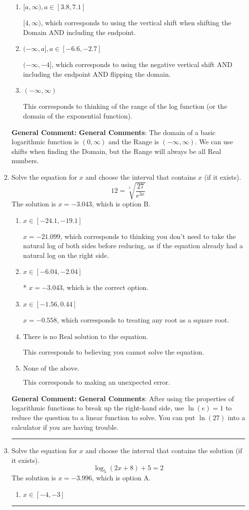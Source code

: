 \documentclass{extbook}[14pt]
\newcommand{\litem}[1]{\item #1

\rule{\textwidth}{0.4pt}}
\begin{document}
\begin{enumerate}
{\begin{enumerate}[label=\Alph*.]
* $(-8, \infty)$, which is the correct option.
\item \( [a, \infty), a \in [3.8, 7.1] \)

$[4, \infty)$, which corresponds to using the vertical shift when shifting the Domain AND including the endpoint.
\item \( (-\infty, a], a \in [-6.6, -2.7] \)

$(-\infty, -4]$, which corresponds to using the negative vertical shift AND including the endpoint AND flipping the domain.
\item \( (-\infty, \infty) \)

This corresponds to thinking of the range of the log function (or the domain of the exponential function).
\end{enumerate}

\textbf{General Comment:} \textbf{General Comments}: The domain of a basic logarithmic function is $(0, \infty)$ and the Range is $(-\infty, \infty)$. We can use shifts when finding the Domain, but the Range will always be all Real numbers.
}
\litem{
 Solve the equation for $x$ and choose the interval that contains $x$ (if it exists).
\[  12 = \sqrt[5]{\frac{27}{e^{3x}}} \]The solution is \( x = -3.043 \), which is option B.\begin{enumerate}[label=\Alph*.]
\item \( x \in [-24.1, -19.1] \)

$x = -21.099$, which corresponds to thinking you don't need to take the natural log of both sides before reducing, as if the equation already had a natural log on the right side.
\item \( x \in [-6.04, -2.04] \)

* $x = -3.043$, which is the correct option.
\item \( x \in [-1.56, 0.44] \)

$x = -0.558$, which corresponds to treating any root as a square root.
\item \( \text{There is no Real solution to the equation.} \)

This corresponds to believing you cannot solve the equation.
\item \( \text{None of the above.} \)

This corresponds to making an unexpected error.
\end{enumerate}

\textbf{General Comment:} \textbf{General Comments}: After using the properties of logarithmic functions to break up the right-hand side, use $\ln(e) = 1$ to reduce the question to a linear function to solve. You can put $\ln(27)$ into a calculator if you are having trouble.
}
\litem{
Solve the equation for $x$ and choose the interval that contains the solution (if it exists).
\[ \log_{5}{(2x+8)}+5 = 2 \]The solution is \( x = -3.996 \), which is option A.\begin{enumerate}[label=\Alph*.]
\item \( x \in [-4, -3] \)


\end{enumerate}}
\end{enumerate}
\end{document}
